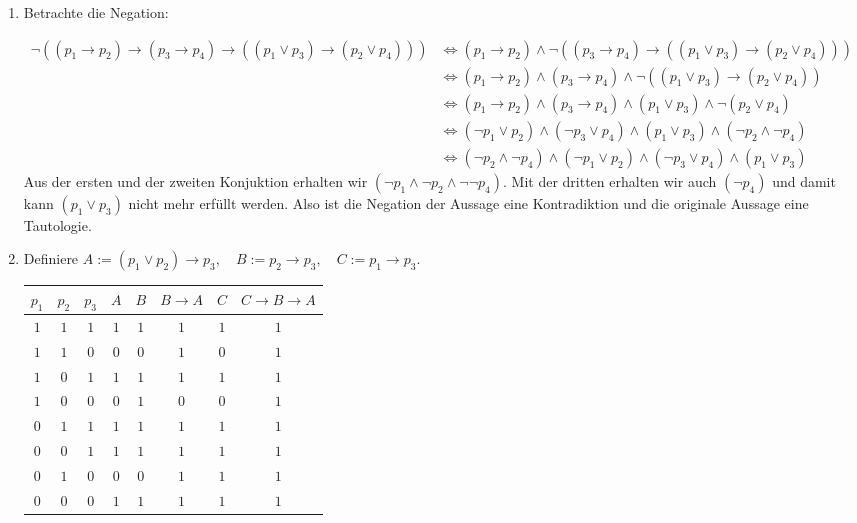 \begin{solution}
\phantom{}
\begin{enumerate}[label = \alph*.]
    \item
    Betrachte die Negation:

    \begin{align*}
      \neg ((p_1 \to p_2) \to (p_3 \to p_4) \to ((p_1 \lor p_3) \to (p_2 \lor p_4))) &\iff
      (p_1 \to p_2) \land \neg ((p_3 \to p_4) \to ((p_1 \lor p_3) \to (p_2 \lor p_4))) \\
      &\iff (p_1 \to p_2) \land (p_3 \to p_4) \land \neg ((p_1 \lor p_3) \to (p_2 \lor p_4)) \\
      &\iff (p_1 \to p_2) \land (p_3 \to p_4) \land (p_1 \lor p_3) \land \neg (p_2 \lor p_4) \\
      &\iff (\neg p_1 \lor p_2) \land (\neg p_3 \lor p_4) \land (p_1 \lor p_3) \land (\neg p_2 \land \neg p_4) \\
      &\iff (\neg p_2 \land \neg p_4) \land (\neg p_1 \lor p_2) \land (\neg p_3 \lor p_4) \land (p_1 \lor p_3)
    \end{align*}
    Aus der ersten und der zweiten Konjuktion erhalten wir $(\neg p_1 \land \neg p_2 \land \neg \neg p_4)$.
    Mit der dritten erhalten wir auch $(\neg p_4)$ und damit kann $(p_1 \lor p_3)$ nicht mehr erfüllt werden.
    Also ist die Negation der Aussage eine Kontradiktion und die originale Aussage eine Tautologie.
    \item
    Definiere $A := (p_1 \lor p_2) \to p_3, \quad B := p_2 \to p_3, \quad C:= p_1 \to p_3$. \\
    \begin{tabular}{|c|c|c|c|c|c|c|c|}
    \hline
    $p_1$ & $p_2$ & $p_3$ & $A$ & $B$ & $B \to A$
    & $C$ & $C \to B \to A$\\
    \hline
    $1$ & $1$ & $1$ & $1$ & $1$ & $1$ & $1$ & $1$\\
    \hline
    $1$ & $1$ & $0$ & $0$ & $0$ & $1$ & $0$ & $1$\\
    \hline
    $1$ & $0$ & $1$ & $1$ & $1$ & $1$ & $1$ & $1$\\
    \hline
    $1$ & $0$ & $0$ & $0$ & $1$ & $0$ & $0$ & $1$\\
    \hline
    $0$ & $1$ & $1$ & $1$ & $1$ & $1$ & $1$ & $1$\\
    \hline
    $0$ & $0$ & $1$ & $1$ & $1$ & $1$ & $1$ & $1$\\
    \hline
    $0$ & $1$ & $0$ & $0$ & $0$ & $1$ & $1$ & $1$\\
    \hline
    $0$ & $0$ & $0$ & $1$ & $1$ & $1$ & $1$ & $1$\\

\end{tabular}
\end{enumerate}
\end{solution}
